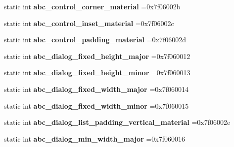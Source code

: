 \begin{DoxyCompactItemize}
static int {\bfseries abc\+\_\+control\+\_\+corner\+\_\+material} =0x7f06002b
\item 
\mbox{\label{classandroid_1_1support_1_1design_1_1R_1_1dimen_aff0dd544dbe6623423aa694514f0dc84}} 
static int {\bfseries abc\+\_\+control\+\_\+inset\+\_\+material} =0x7f06002c
\item 
\mbox{\label{classandroid_1_1support_1_1design_1_1R_1_1dimen_aeede1b4684b5ed871979a644cf1b0ce9}} 
static int {\bfseries abc\+\_\+control\+\_\+padding\+\_\+material} =0x7f06002d
\item 
\mbox{\label{classandroid_1_1support_1_1design_1_1R_1_1dimen_a29d54a724f87126a3aa7a8596232dbc6}} 
static int {\bfseries abc\+\_\+dialog\+\_\+fixed\+\_\+height\+\_\+major} =0x7f060012
\item 
\mbox{\label{classandroid_1_1support_1_1design_1_1R_1_1dimen_a4941c0bccd8480ddf69d7fe0a7278adc}} 
static int {\bfseries abc\+\_\+dialog\+\_\+fixed\+\_\+height\+\_\+minor} =0x7f060013
\item 
\mbox{\label{classandroid_1_1support_1_1design_1_1R_1_1dimen_a097e9431a08352951038b6d831114abe}} 
static int {\bfseries abc\+\_\+dialog\+\_\+fixed\+\_\+width\+\_\+major} =0x7f060014
\item 
\mbox{\label{classandroid_1_1support_1_1design_1_1R_1_1dimen_a5c11e694dee49a1ee548149a0204f928}} 
static int {\bfseries abc\+\_\+dialog\+\_\+fixed\+\_\+width\+\_\+minor} =0x7f060015
\item 
\mbox{\label{classandroid_1_1support_1_1design_1_1R_1_1dimen_add980756ee797db6f42bf70c3fe8a51f}} 
static int {\bfseries abc\+\_\+dialog\+\_\+list\+\_\+padding\+\_\+vertical\+\_\+material} =0x7f06002e
\item 
\mbox{\label{classandroid_1_1support_1_1design_1_1R_1_1dimen_a5190672d0981fb344c46223f22e6b64c}} 
static int {\bfseries abc\+\_\+dialog\+\_\+min\+\_\+width\+\_\+major} =0x7f060016

\end{DoxyCompactItemize}

